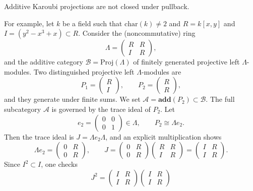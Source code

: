 \documentclass[a4paper,10pt, oneside]{amsart}
\begin{document}
	\begin{exam}\label{exa2}
		Additive Karoubi projections are not closed under pullback.
		
		For example, let $k$ be a field such that $\text{char}(k) \neq 2$ and $R=k[x,y]$ and $I=(y^2-x^3+x)\subset R$.  Consider the (noncommutative) ring
		\[
		\Lambda=\begin{pmatrix}R & R \\ I & R\end{pmatrix},
		\]
		and the additive category $\mathcal{B}=\mathrm{Proj}(\Lambda)$ of finitely generated projective left $\Lambda$-modules. Two distinguished projective left $\Lambda$-modules are
		\[
		P_1=\begin{pmatrix}R\\ I\end{pmatrix},\qquad P_2=\begin{pmatrix}R\\ R\end{pmatrix},
		\]
		and they generate \mcb under finite sums. %
		We set $\mathcal{A}=\mathbf{add}(P_2)\subset \mathcal{B}$.
		The full subcategory $\mathcal{A}$ is governed by the trace ideal of $P_2$. Let
		\[
		e_2=\begin{pmatrix}0 & 0 \\ 0 & 1\end{pmatrix}\in \Lambda,\qquad P_2\cong \Lambda e_2.
		\]
		Then the trace ideal is $J=\Lambda e_2\Lambda$, and an explicit multiplication shows
		\[
		\Lambda e_2=\begin{pmatrix}0 & R\\ 0 & R\end{pmatrix},\qquad
		J=\begin{pmatrix}0 & R\\ 0 & R\end{pmatrix}\begin{pmatrix}R & R\\ I & R\end{pmatrix}
		=\begin{pmatrix}I & R\\ I & R\end{pmatrix}.
		\]
		Since $I^2\subset I$, one checks
		\[
		J^2=\begin{pmatrix}I & R\\ I & R\end{pmatrix}\begin{pmatrix}I & R\\ I & R\end{pmatrix}
\]
\end{exam}
\end{document}
